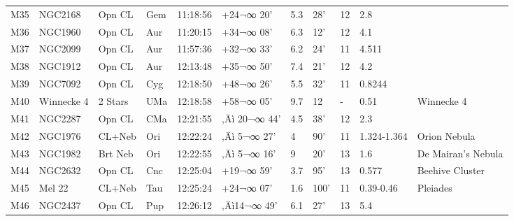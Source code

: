 \documentclass[10pt,twoside,a4paper,english]{report}
\begin{document}
\begin{longtable}{@{}lllllllllll@{}}
M35        & NGC2168     & Opn CL     & Gem       & 11:18:56 & +24¬∞ 20'  & 5.3       & 28'                  & 12       & 2.8                 &                                           \\ 
M36        & NGC1960     & Opn CL     & Aur       & 11:20:15 & +34¬∞ 08'  & 6.3       & 12'                  & 12       & 4.1                 &                                           \\ 
M37        & NGC2099     & Opn CL     & Aur       & 11:57:36 & +32¬∞ 33'  & 6.2       & 24'                  & 11       & 4.511               &                                           \\ 
M38        & NGC1912     & Opn CL     & Aur       & 12:13:48 & +35¬∞ 50'  & 7.4       & 21'                  & 12       & 4.2                 &                                           \\ 
M39        & NGC7092     & Opn CL     & Cyg       & 12:18:50 & +48¬∞ 26'  & 5.5       & 32'                  & 11       & 0.8244              &                                           \\ 
M40        & Winnecke 4  & 2 Stars    & UMa       & 12:18:58 & +58¬∞ 05'  & 9.7       & 12                   & -        & 0.51                & Winnecke 4                                \\ 
M41        & NGC2287     & Opn CL     & CMa       & 12:21:55 & ‚Äì 20¬∞ 44' & 4.5       & 38'                  & 12       & 2.3                 &                                           \\ 
M42        & NGC1976     & CL+Neb     & Ori       & 12:22:24 & ‚Äì 5¬∞ 27'  & 4         & 90'                  & 11       & 1.324-1.364         & Orion Nebula                              \\ 
M43        & NGC1982     & Brt Neb    & Ori       & 12:22:55 & ‚Äì 5¬∞ 16'  & 9         & 20'                  & 13       & 1.6                 & De Mairan's Nebula                        \\ 
M44        & NGC2632     & Opn CL     & Cnc       & 12:25:04 & +19¬∞ 59'  & 3.7       & 95'                  & 13       & 0.577               & Beehive Cluster                           \\ 
M45        & Mel 22      & CL+Neb     & Tau       & 12:25:24 & +24¬∞ 07'  & 1.6       & 100'                 & 11       & 0.39-0.46           & Pleiades                                  \\ 
M46        & NGC2437     & Opn CL     & Pup       & 12:26:12 & ‚Äì14¬∞ 49'  & 6.1       & 27'                  & 13       & 5.4                 &                                           \\ 

\end{longtable}
\end{document}
